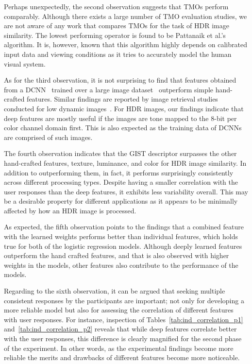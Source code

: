 Perhaps unexpectedly, the second observation suggests that TMOs perform comparably. Although there exists a large number of TMO evaluation studies, we are not aware of any work that compares TMOs for the task of HDR image similarity. The lowest performing operator is found to be Pattanaik et al.'s~\cite{pattanaik2000time} algorithm. It is, however, known that this algorithm highly depends on calibrated input data and viewing conditions as it tries to accurately model the human visual system.

As for the third observation, it is not surprising to find that features obtained from a DCNN~\cite{simonyan2014very} trained over a large image dataset~\cite{russakovsky2015imagenet} outperform simple hand-crafted features. Similar findings are reported by image retrieval studies conducted for low dynamic images~\cite{wan2014deep,gordo2016deep}. For HDR images, our findings indicate that deep features are mostly useful if the images are tone mapped to the 8-bit per color channel domain first. This is also expected as the training data of DCNNs are comprised of such images.

The fourth observation indicates that the GIST descriptor surpasses the other hand-crafted features, texture, luminance, and color for HDR image similarity. In addition to outperforming them, in fact, it performs surprisingly consistently across different processing types. Despite having a smaller correlation with the user responses than the deep features, it exhibits less variability overall. This may be a desirable property for different applications as it appears to be minimally affected by how an HDR image is processed.

As expected, the fifth observation points to the findings that a combined feature with the learned weights performs better than individual features, which holds true for both of the logistic regression models. Although deeply learned features outperform the hand crafted features, and that is also observed with higher weights in the models, other features also contribute to the performance of the models. 

Regarding to the sixth observation, it can be argued that seeking multiple consistent responses by the participants are important; not only for developing a more reliable model but also for assessing the correlation of different features with user responses. For instance, inspection of Tables~\ref{tab:ind_correlation_p1} and~\ref{tab:ind_correlation_p2} reveals that while deep features correlate better with the user responses, this difference is clearly magnified for the second phase of the experiment. In other words, as the experimental findings become more reliable the merits and drawbacks of different features become more noticeable.


